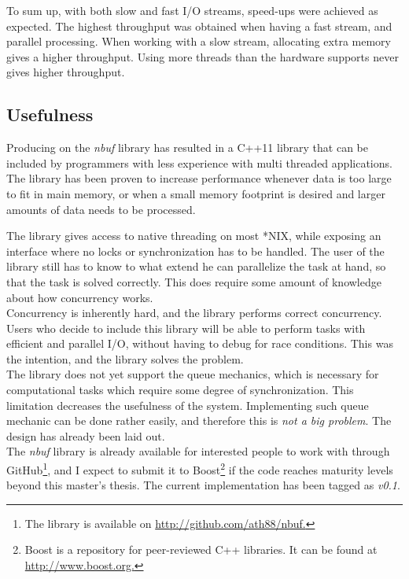 \documentclass[a4paper]{article}
\newcommand{\nbuf}{\textit{nbuf} }
\begin{document}
To sum up, with both slow and fast I/O streams, speed-ups were achieved as expected. The highest throughput was obtained when having a fast stream, and parallel processing. When working with a slow stream, allocating extra memory gives a higher throughput. Using more threads than the hardware supports never gives higher throughput.


\subsection{Usefulness}
Producing on the \nbuf library has resulted in a C++11 library that can be included by programmers with less experience with multi threaded applications. The library has been proven to increase performance whenever data is too large to fit in main memory, or when a small memory footprint is desired and larger amounts of data needs to be processed.

The library gives access to native threading on most *NIX, while exposing an interface where no locks or synchronization has to be handled. The user of the library still has to know to what extend he can parallelize the task at hand, so that the task is solved correctly. This does require some amount of knowledge about how concurrency works.\\

Concurrency is inherently hard, and the library performs correct concurrency. Users who decide to include this library will be able to perform tasks with efficient and parallel I/O, without having to debug for race conditions. This was the intention, and the library solves the problem.\\

The library does not yet support the queue mechanics, which is necessary for computational tasks which require some degree of synchronization. This limitation decreases the usefulness of the system. Implementing such queue mechanic can be done rather easily, and therefore this is \textit{not a big problem}. The design has already been laid out.\\

The \nbuf library is already available for interested people to work with through GitHub\footnote{The library is available on \url{http://github.com/ath88/nbuf.}}, and I expect to submit it to Boost\footnote{Boost is a repository for peer-reviewed C++ libraries. It can be found at \url{http://www.boost.org.}} if the code reaches maturity levels beyond this master's thesis. The current implementation has been tagged as \textit{v0.1}.
\end{document}
